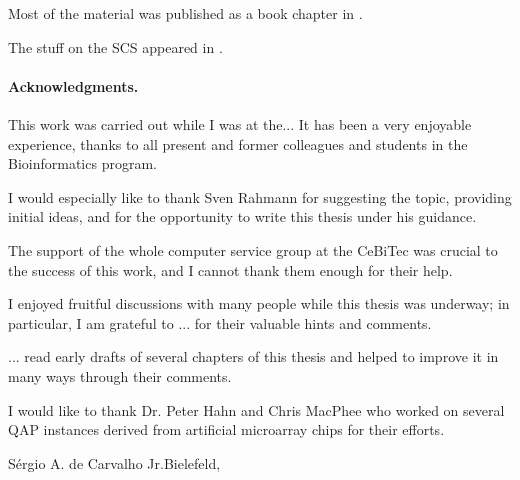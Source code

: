 Most of the material was published as a book chapter in \citet{Carvalho2007}.

The stuff on the SCS appeared in \citet{Carvalho2005}.

\paragraph{Acknowledgments.}
This work was carried out while I was at the...
It has been a very enjoyable experience, thanks to all present and
former colleagues and students in the Bioinformatics program.

I would especially like to thank Sven Rahmann for suggesting the
topic, providing initial ideas, and for the opportunity to write this
thesis under his guidance.

The support of the whole computer service group at the CeBiTec was
crucial to the success of this work, and I cannot thank them enough
for their help.

I enjoyed fruitful discussions with many people while this thesis was
underway; in particular, I am grateful to ...
for their valuable hints and comments. 

... read early drafts of several chapters of this thesis and
helped to improve it in many ways through their comments.

I would like to thank Dr. Peter Hahn and Chris MacPhee who worked on several QAP instances
derived from artificial microarray chips for their efforts.


\vspace*{6ex}
S\'ergio A. de Carvalho Jr.\hfill Bielefeld, \handindate
